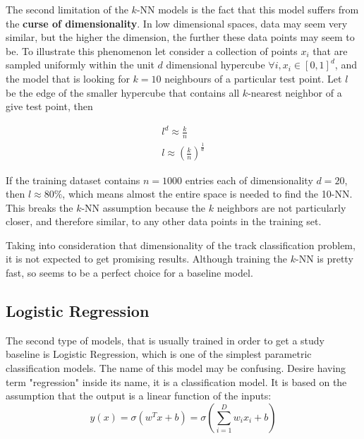 The second limitation of the $k$-NN models is the fact that this model suffers from the\textbf{ curse of dimensionality}.  In low dimensional spaces, data may seem very similar, but the higher the dimension, the further these data points may seem to be. To illustrate this phenomenon let consider a collection of points $x_i$ that are sampled uniformly within the unit  $d$ dimensional hypercube $\forall i, x_i \in [0,1]^{d} $, and the model that is looking for $k=10$ neighbours of a particular test point. Let $l$ be the edge of the smaller hypercube that contains all $k$-nearest neighbor of a give test point, then 

\begin{align}
l^{d} \approx \frac{k}{n} \nonumber \\
l \approx (\frac{k}{n})^{\frac{1}{d}}
\end{align}

If the training dataset contains $n=1000$ entries each of dimensionality $d=20$, then $l \approx 80\%$, which means almost the entire space is needed to find the 10-NN. This breaks the $k$-NN  assumption because the $k$ neighbors are not particularly closer, and therefore similar, to any other data points in the training set. 

Taking into consideration that dimensionality of the track classification problem, it is not expected to get promising results. Although training the $k$-NN is pretty fast, so seems to be a perfect choice for a baseline model. 

\subsection{Logistic Regression}

The second type of models, that is usually trained in order to get a study baseline is Logistic Regression, which is one of the simplest parametric classification models. The name of this model may be confusing. Desire having term "regression" inside its name, it is a classification model. It is based on the assumption that the output is a linear function of the inputs: 
\begin{equation}
\label{eq:logreg}
    y(x) = \sigma (w^{T}x + b) = \sigma \left(\sum_{i=1}^{D}w_ix_i +b\right) 
\end{equation}

